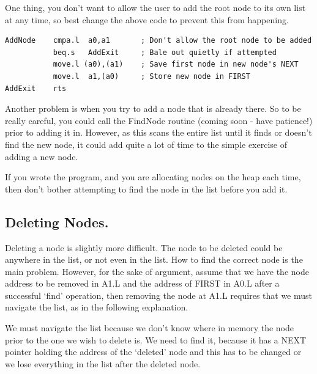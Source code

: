 One thing, you don't want to allow the user to add the root node
      to its own list at any time, so best change the above code to prevent
      this from happening.

\begin{lstlisting}[firstnumber=3,caption={A Better Way of Adding a Node},label={lst:BetterAddingANode}]
AddNode    cmpa.l  a0,a1       ; Don't allow the root node to be added
           beq.s   AddExit     ; Bale out quietly if attempted
           move.l (a0),(a1)    ; Save first node in new node's NEXT
           move.l  a1,(a0)     ; Store new node in FIRST
AddExit    rts
\end{lstlisting}

Another problem is when you try to add a node that is already
      there. So to be really careful, you could call the FindNode routine
      (coming soon -{} have patience!) prior to adding it in. However, as this
      scans the entire list until it finds or doesn't find the new node, it
      could add quite a lot of time to the simple exercise of adding a new
      node.

If you wrote the program, and you are allocating nodes on the heap
      each time, then don't bother attempting to find the node in the list
      before you add it.

\subsection{Deleting Nodes.}
\label{ch10-deleting-nodes}%

Deleting a node is slightly more difficult. The node to be deleted
      could be anywhere in the list, or not even in the list. How to find the
      correct node is the main problem. However, for the sake of argument,
      assume that we have the node address to be removed in A1.L and the
      address of FIRST in A0.L after a successful `find' operation, then
      removing the node at A1.L requires that we must navigate the list, as in
      the following explanation.

We must navigate the list because we don't know where in memory
      the node prior to the one we wish to delete is. We need to find it,
      because it has a NEXT pointer holding the address of the `deleted' node
      and this has to be changed or we lose everything in the list after the
      deleted node.

